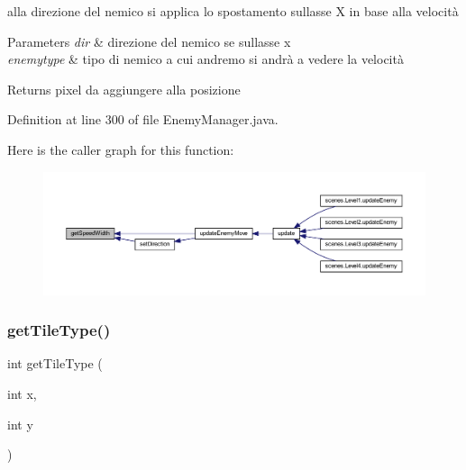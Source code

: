 alla direzione del nemico si applica lo spostamento sull\textquotesingle{}asse X in base alla velocità 


\begin{DoxyParams}{Parameters}
{\em dir} & direzione del nemico se sull\textquotesingle{}asse x \\
\hline
{\em enemytype} & tipo di nemico a cui andremo si andrà a vedere la velocità\\
\hline
\end{DoxyParams}
\begin{DoxyReturn}{Returns}
pixel da aggiungere alla posizione 
\end{DoxyReturn}


Definition at line 300 of file Enemy\+Manager.\+java.

Here is the caller graph for this function\+:
\nopagebreak
\begin{figure}[H]
\begin{center}
\leavevmode
\includegraphics[width=350pt]{classmanagers_1_1_enemy_manager_ae622455c9dd19d2583b9a8840b1b35de_icgraph}
\end{center}
\end{figure}
\mbox{\label{classmanagers_1_1_enemy_manager_ac689e72523c8460ac3160526d310b1b7}} 
\subsubsection{\texorpdfstring{get\+Tile\+Type()}{getTileType()}}
{\footnotesize\ttfamily int get\+Tile\+Type (\begin{DoxyParamCaption}\item[{int}]{x,  }\item[{int}]{y }\end{DoxyParamCaption})\hspace{0.3cm}{\ttfamily [private]}}



